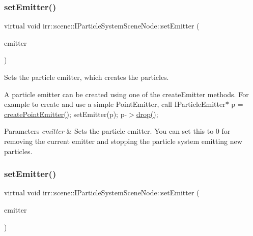 \subsubsection{\texorpdfstring{set\+Emitter()}{setEmitter()}\hspace{0.1cm}{\footnotesize\ttfamily [1/2]}}
{\footnotesize\ttfamily virtual void irr\+::scene\+::\+I\+Particle\+System\+Scene\+Node\+::set\+Emitter (\begin{DoxyParamCaption}\item[{\hyperlink{classirr_1_1scene_1_1IParticleEmitter}{I\+Particle\+Emitter} $\ast$}]{emitter }\end{DoxyParamCaption})\hspace{0.3cm}{\ttfamily [pure virtual]}}



Sets the particle emitter, which creates the particles. 

A particle emitter can be created using one of the create\+Emitter methods. For example to create and use a simple Point\+Emitter, call I\+Particle\+Emitter$\ast$ p = \hyperlink{classirr_1_1scene_1_1IParticleSystemSceneNode_a99e2549ad185f0c23b73f43869c60ab8}{create\+Point\+Emitter()}; set\+Emitter(p); p-\/$>$\hyperlink{classirr_1_1IReferenceCounted_a03856a09355b89d178090c4a5f738543}{drop()}; 
\begin{DoxyParams}{Parameters}
{\em emitter} & Sets the particle emitter. You can set this to 0 for removing the current emitter and stopping the particle system emitting new particles. \\
\hline
\end{DoxyParams}
\mbox{\label{classirr_1_1scene_1_1IParticleSystemSceneNode_aececff4531482ce976f1859c40bf3f76}} 
\subsubsection{\texorpdfstring{set\+Emitter()}{setEmitter()}\hspace{0.1cm}{\footnotesize\ttfamily [2/2]}}
{\footnotesize\ttfamily virtual void irr\+::scene\+::\+I\+Particle\+System\+Scene\+Node\+::set\+Emitter (\begin{DoxyParamCaption}\item[{\hyperlink{classirr_1_1scene_1_1IParticleEmitter}{I\+Particle\+Emitter} $\ast$}]{emitter }\end{DoxyParamCaption})\hspace{0.3cm}{\ttfamily [pure virtual]}}



